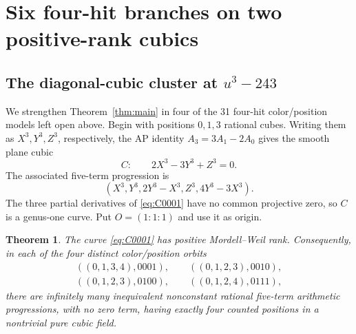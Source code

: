 \documentclass[10pt]{article}
\newtheorem{theorem}{Theorem}[section]
\begin{document}
\section{Six four-hit branches on two positive-rank cubics}

\subsection{The diagonal-cubic cluster at \texorpdfstring{$u^3-243$}{u3-243}}

We strengthen Theorem~\ref{thm:main} in four of the 31
four-hit color/position models left open above.  Begin with positions
$0,1,3$ rational cubes.  Writing them as $X^3,Y^3,Z^3$, respectively, the
AP identity $A_3=3A_1-2A_0$ gives the smooth plane cubic
\begin{equation}\label{eq:C0001}
C:\qquad 2X^3-3Y^3+Z^3=0.
\end{equation}
The associated five-term progression is
\begin{equation}\label{eq:AP0001}
 (X^3,Y^3,2Y^3-X^3,Z^3,4Y^3-3X^3).
\end{equation}
The three partial derivatives of \eqref{eq:C0001} have no common projective
zero, so $C$ is a genus-one curve.  Put $O=(1:1:1)$ and use it as origin.

\begin{theorem}\label{thm:0001}
The curve \eqref{eq:C0001} has positive Mordell--Weil rank.  Consequently,
in each of the four distinct color/position orbits
\[
\begin{gathered}
((0,1,3,4),0001),\qquad ((0,1,2,3),0010),\\
((0,1,2,3),0100),\qquad ((0,1,2,4),0111),
\end{gathered}
\]
there are infinitely many inequivalent nonconstant rational five-term
arithmetic progressions, with no zero term, having exactly four counted
positions in a nontrivial pure cubic field.
\end{theorem}
\end{document}
